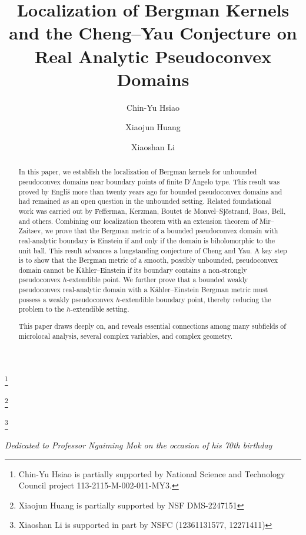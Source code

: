 \documentclass[a4paper,centertags,oneside,12pt]{amsart}
\numberwithin{equation}{section}
\begin{document}
\title{Localization of Bergman Kernels and the Cheng--Yau Conjecture on Real Analytic Pseudoconvex Domains}
\author{Chin-Yu Hsiao}
\address{Department of Mathematics, National Taiwan University}
\thanks{Chin-Yu Hsiao is partially supported by National Science and Technology Council project 113-2115-M-002-011-MY3.}
\author{Xiaojun Huang}
\address{Department of Mathematics, Rutgers University, New Brunswick, NJ 08903, USA.}
\thanks{Xiaojun Huang is partially supported  by NSF DMS-2247151}


\author{Xiaoshan Li}
\address{School of Mathematics and Statistics, Wuhan University, Wuhan, Hubei 430072, China.}
\thanks{Xiaoshan Li is supported in part by NSFC (12361131577, 12271411)}
\maketitle 
\bigskip

\begin{center}
\vspace{-8pt} \small \itshape
  Dedicated to Professor Ngaiming Mok on the occasion of his 70th birthday
\vspace{-5pt} 
\end{center}

\begin{abstract}
In this paper, we establish the localization of Bergman kernels for unbounded pseudoconvex domains near boundary points of finite D'Angelo type. This result was proved by Engliš more than twenty years ago for bounded pseudoconvex domains and had remained as an open question   in the unbounded setting.  Related foundational work was carried out by Fefferman, Kerzman, Boutet de Monvel--Sjöstrand, Boas, Bell, and others. Combining our localization theorem with an extension theorem of Mir--Zaitsev, we prove that the Bergman metric of a bounded pseudoconvex domain with real-analytic boundary is Einstein if and only if the domain is biholomorphic to the unit ball. This result advances a longstanding conjecture of Cheng and Yau.
A key step is to show that the Bergman metric of a smooth, possibly unbounded, pseudoconvex domain cannot be Kähler--Einstein if its boundary contains a non-strongly pseudoconvex \(h\)-extendible point. We further prove that a  bounded weakly pseudoconvex real-analytic domain    with a Kähler--Einstein Bergman metric must possess a weakly pseudoconvex \(h\)-extendible boundary point, thereby reducing the problem to the \(h\)-extendible setting.

This paper draws deeply on, and reveals essential connections among many subfields of microlocal analysis, several complex variables, and complex geometry.


\end{abstract}
\end{document}
